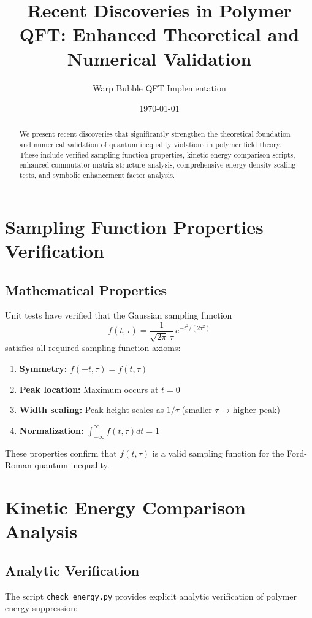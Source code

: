 \documentclass[11pt]{article}
\title{Recent Discoveries in Polymer QFT: Enhanced Theoretical and Numerical Validation}
\author{Warp Bubble QFT Implementation}
\date{\today}
\begin{document}
\maketitle

\begin{abstract}
We present recent discoveries that significantly strengthen the theoretical foundation and numerical validation of quantum inequality violations in polymer field theory. These include verified sampling function properties, kinetic energy comparison scripts, enhanced commutator matrix structure analysis, comprehensive energy density scaling tests, and symbolic enhancement factor analysis.
\end{abstract}

\section{Sampling Function Properties Verification}

\subsection{Mathematical Properties}
Unit tests have verified that the Gaussian sampling function
\begin{equation}
f(t,\tau) = \frac{1}{\sqrt{2\pi}\,\tau}\,e^{-t^2/(2\tau^2)}
\end{equation}
satisfies all required sampling function axioms:

\begin{enumerate}
\item \textbf{Symmetry:} $f(-t,\tau) = f(t,\tau)$ 
\item \textbf{Peak location:} Maximum occurs at $t = 0$
\item \textbf{Width scaling:} Peak height scales as $1/\tau$ (smaller $\tau$ → higher peak)
\item \textbf{Normalization:} $\int_{-\infty}^{\infty} f(t,\tau) dt = 1$
\end{enumerate}

These properties confirm that $f(t,\tau)$ is a valid sampling function for the Ford-Roman quantum inequality.

\section{Kinetic Energy Comparison Analysis}

\subsection{Analytic Verification}
The script \texttt{check\_energy.py} provides explicit analytic verification of polymer energy suppression:
\end{document}
